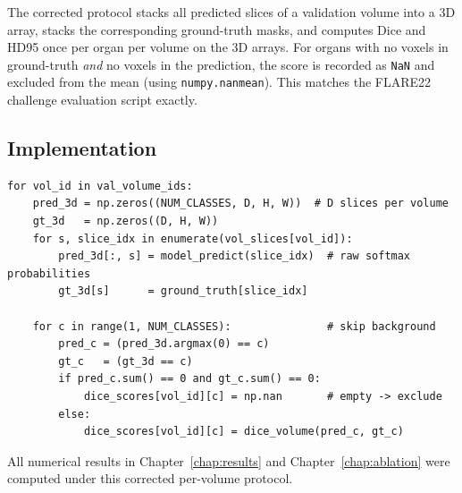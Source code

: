 The corrected protocol stacks all predicted slices of a validation volume into a 3D array,
stacks the corresponding ground-truth masks, and computes Dice and HD95 once per organ per
volume on the 3D arrays. For organs with no voxels in ground-truth \emph{and} no voxels in the
prediction, the score is recorded as \texttt{NaN} and excluded from the mean (using
\texttt{numpy.nanmean}). This matches the FLARE22 challenge evaluation script exactly.

\subsection{Implementation}

\begin{verbatim}
for vol_id in val_volume_ids:
    pred_3d = np.zeros((NUM_CLASSES, D, H, W))  # D slices per volume
    gt_3d   = np.zeros((D, H, W))
    for s, slice_idx in enumerate(vol_slices[vol_id]):
        pred_3d[:, s] = model_predict(slice_idx)  # raw softmax probabilities
        gt_3d[s]      = ground_truth[slice_idx]

    for c in range(1, NUM_CLASSES):               # skip background
        pred_c = (pred_3d.argmax(0) == c)
        gt_c   = (gt_3d == c)
        if pred_c.sum() == 0 and gt_c.sum() == 0:
            dice_scores[vol_id][c] = np.nan       # empty -> exclude
        else:
            dice_scores[vol_id][c] = dice_volume(pred_c, gt_c)
\end{verbatim}

All numerical results in Chapter~\ref{chap:results} and Chapter~\ref{chap:ablation} were
computed under this corrected per-volume protocol.
